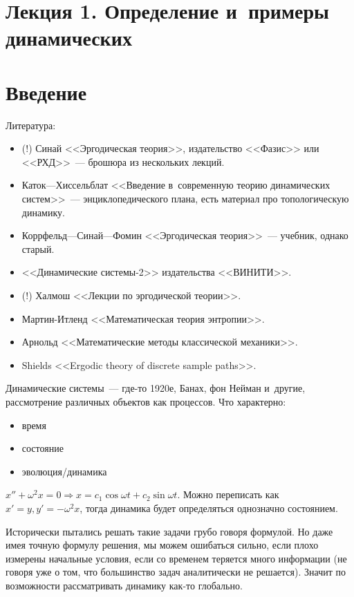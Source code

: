 \documentclass{article}
\begin{document}
\section*{Лекция 1. Определение и~примеры динамических}
\resetcntrs

\section{Введение}

Литература:
\begin{itemize}
	\item (!) Синай <<Эргодическая теория>>, издательство <<Фазис>> или
		<<РХД>>~--- брошюра из нескольких лекций.
	\item Каток---Хиссельблат <<Введение в~современную теорию динамических
		систем>>~--- энциклопедического плана, есть материал про топологическую
		динамику.
	\item Коррфельд---Синай---Фомин <<Эргодическая теория>>~--- учебник, однако
		старый.
	\item <<Динамические системы-2>> издательства <<ВИНИТИ>>.
	\item (!) Халмош <<Лекции по эргодической теории>>.
	\item Мартин-Итленд <<Математическая теория энтропии>>.
	\item Арнольд <<Математические методы классической механики>>.
	\item Shields <<Ergodic theory of discrete sample paths>>.
\end{itemize}

Динамические системы~--- где-то 1920е, Банах, фон Нейман и~другие, рассмотрение
различных объектов как процессов. Что характерно:
\begin{itemize}
	\item время
	\item состояние
	\item эволюция/динамика
\end{itemize}

\begin{example}
	$x'' + \omega^2 x = 0 \Rightarrow x = c_1 \cos \omega t + c_2 \sin \omega t$.
	Можно переписать как~$x' = y, y' = -\omega^2 x$, тогда динамика будет
	определяться однозначно состоянием.
\end{example}

Исторически пытались решать такие задачи грубо говоря формулой. Но даже имея
точную формулу решения, мы можем ошибаться сильно, если плохо измерены
начальные условия, если со временем теряется много информации (не говоря уже о
том, что большинство задач аналитически не решается).  Значит по возможности
рассматривать динамику как-то глобально.
\end{document}
